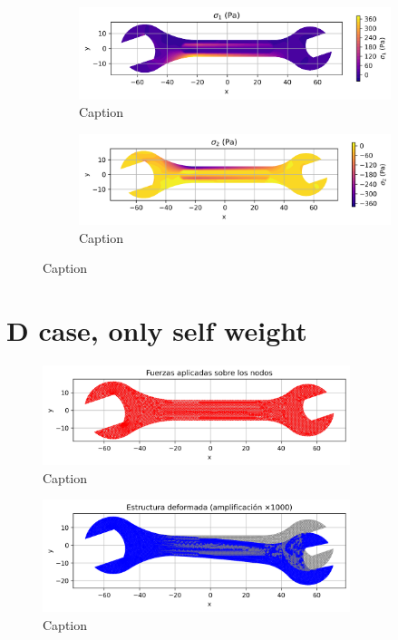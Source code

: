 \begin{figure}[H]
  \centering
  \begin{subfigure}[t]{0.49\textwidth}
    \centering
    \includegraphics[width=\textwidth]{GRAFICOS/Case c - sigma_1.png}
    \caption{Caption}
    \label{fig:deformada_reacciones}
  \end{subfigure}
  \hfill
  \begin{subfigure}[t]{0.49\textwidth}
    \centering
    \includegraphics[width=\textwidth]{GRAFICOS/Case c - sigma_2.png}
    \caption{Caption}
    \label{fig:von_mises}
  \end{subfigure}
  \caption{Caption}
  \label{fig:analisis_estructural}
\end{figure}

\section{D case, only self weight}

\begin{figure}[H]
  \centering
  \includegraphics[width=0.8\textwidth]{GRAFICOS/Case d_fuerzas.png}
  \caption{Caption}
  \label{fig:strain}
\end{figure}

\begin{figure}[H]
  \centering
  \includegraphics[width=0.8\textwidth]{GRAFICOS/Case d_deformada.png}
  \caption{Caption}
  \label{fig:stress}
\end{figure}

